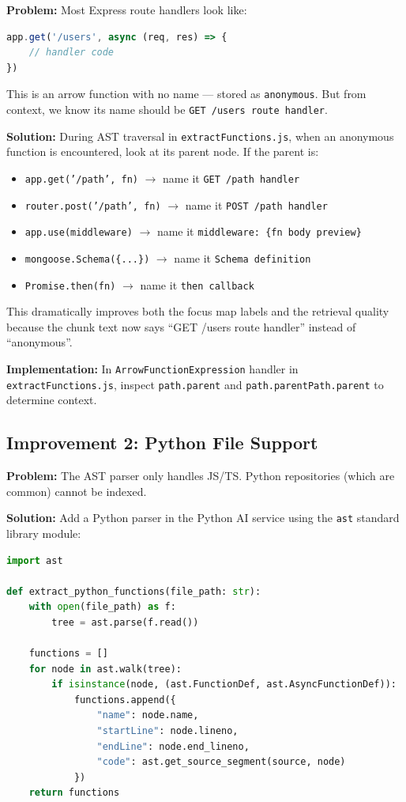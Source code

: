 \documentclass[a4paper,11pt]{article}
\begin{document}
\textbf{Problem:} Most Express route handlers look like:
\begin{lstlisting}[language=JavaScript]
app.get('/users', async (req, res) => {
    // handler code
})
\end{lstlisting}
This is an arrow function with no name --- stored as \texttt{anonymous}. But from context, we know its name should be \texttt{GET /users route handler}.

\textbf{Solution:} During AST traversal in \texttt{extractFunctions.js}, when an anonymous function is encountered, look at its parent node. If the parent is:
\begin{itemize}
    \item \texttt{app.get('/path', fn)} $\rightarrow$ name it \texttt{GET /path handler}
    \item \texttt{router.post('/path', fn)} $\rightarrow$ name it \texttt{POST /path handler}
    \item \texttt{app.use(middleware)} $\rightarrow$ name it \texttt{middleware: \{fn body preview\}}
    \item \texttt{mongoose.Schema(\{...\})} $\rightarrow$ name it \texttt{Schema definition}
    \item \texttt{Promise.then(fn)} $\rightarrow$ name it \texttt{then callback}
\end{itemize}

This dramatically improves both the focus map labels and the retrieval quality because the chunk text now says ``GET /users route handler'' instead of ``anonymous''.

\textbf{Implementation:} In \texttt{ArrowFunctionExpression} handler in \texttt{extractFunctions.js}, inspect \texttt{path.parent} and \texttt{path.parentPath.parent} to determine context.

\subsection{Improvement 2: Python File Support}

\textbf{Problem:} The AST parser only handles JS/TS. Python repositories (which are common) cannot be indexed.

\textbf{Solution:} Add a Python parser in the Python AI service using the \texttt{ast} standard library module:
\begin{lstlisting}[language=Python]
import ast

def extract_python_functions(file_path: str):
    with open(file_path) as f:
        tree = ast.parse(f.read())
    
    functions = []
    for node in ast.walk(tree):
        if isinstance(node, (ast.FunctionDef, ast.AsyncFunctionDef)):
            functions.append({
                "name": node.name,
                "startLine": node.lineno,
                "endLine": node.end_lineno,
                "code": ast.get_source_segment(source, node)
            })
    return functions
\end{lstlisting}
\end{document}
